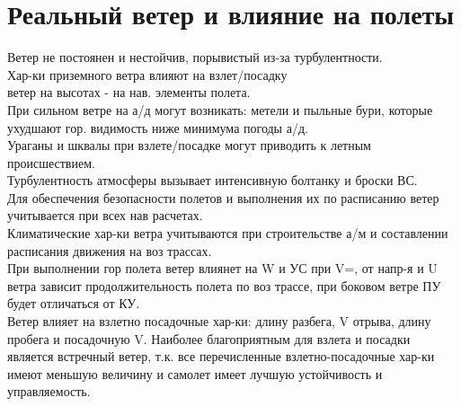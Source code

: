 
\section{Реальный ветер и влияние на полеты}
Ветер не постоянен и нестойчив, порывистый из-за турбулентности.\\
Хар-ки приземного ветра влияют на взлет/посадку\\
ветер на высотах - на нав. элементы полета.\\
При сильном ветре на а/д могут возникать: метели и пыльные бури, которые ухудшают гор. видимость ниже минимума погоды а/д.\\
Ураганы и шквалы при взлете/посадке могут приводить к летным происшествием.\\
Турбулентность атмосферы вызывает интенсивную болтанку и броски ВС.\\
Для обеспечения безопасности полетов и выполнения их по расписанию ветер учитывается при всех нав расчетах.\\
Климатические хар-ки ветра учитываются при строительстве а/м и составлении расписания движения на воз трассах.\\ 
При выполнении гор полета ветер влиянет на W и УС при V=, от напр-я и U ветра зависит продолжительность полета по воз трассе, при боковом ветре ПУ будет отличаться от КУ.\\
Ветер влияет на взлетно посадочные хар-ки: длину разбега, V отрыва, длину пробега и посадочную V. Наиболее благоприятным для взлета и посадки является встречный ветер, т.к. все перечисленные взлетно-посадочные хар-ки имеют меньшую величину и самолет имеет лучшую устойчивость и управляемость.